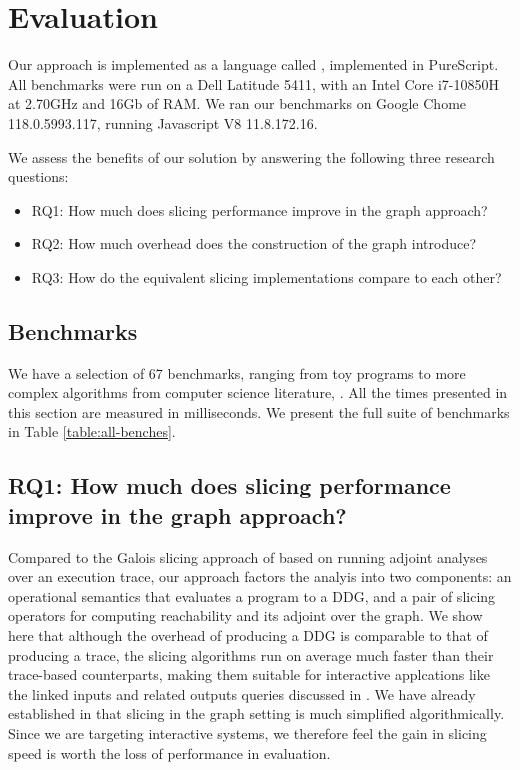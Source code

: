 \section{Evaluation}
\label{sec:evaluation}

Our approach is implemented as a language called \OurLang, implemented in PureScript. All benchmarks were run
on a Dell Latitude 5411, with an Intel Core i7-10850H at 2.70GHz and 16Gb of RAM. We ran our benchmarks on
Google Chome 118.0.5993.117, running Javascript V8 11.8.172.16.

We assess the benefits of our solution by answering the following three research questions:
\begin{itemize}
    \item RQ1: How much does slicing performance improve in the graph approach?
    \item RQ2: How much overhead does the construction of the graph introduce?
    \item RQ3: How do the equivalent slicing implementations compare to each other?
\end{itemize}

\subsection{Benchmarks} \label{sec:benchmarks}
We have a selection of 67 benchmarks, ranging from toy programs to more complex
algorithms from computer science literature, .
All the times presented in this
section are measured in milliseconds. We present the full suite of benchmarks in
Table \ref{table:all-benches}.

\subsection{RQ1: How much does slicing performance improve in the graph approach?}

Compared to the Galois slicing approach of \citet{perera22} based on running adjoint analyses over an
execution trace, our approach factors the analyis into two components: an operational semantics that evaluates
a program to a DDG, and a pair of slicing operators for computing reachability and its adjoint over the graph.
We show here that although the overhead of producing a DDG is comparable to that of producing a trace, the
slicing algorithms run on average much faster than their trace-based counterparts, making them suitable for
interactive applcations like the linked inputs and related outputs queries discussed in .
We have already established in  that slicing in the graph setting is much simplified
algorithmically. Since we are targeting interactive systems, we therefore feel the gain in slicing speed is
worth the loss of performance in evaluation.

